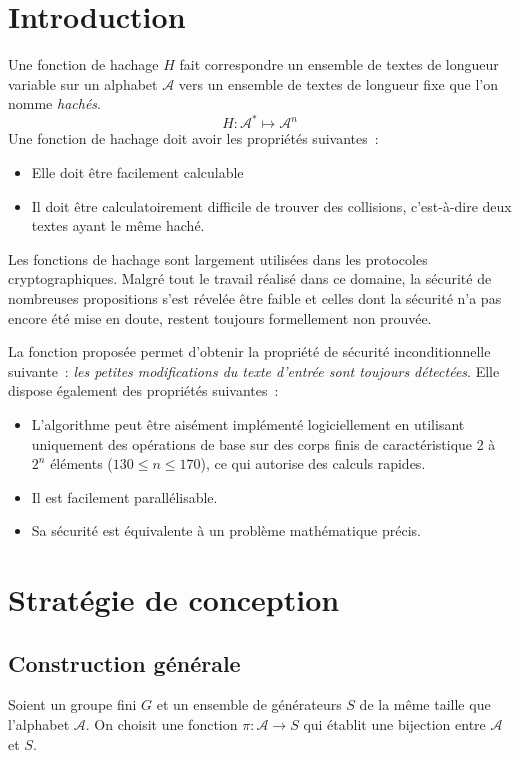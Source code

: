 \documentclass[a4paper,10pt]{article}
\theoremstyle{break}
\newcommand{\A}{\mathcal{A}}
\begin{document}
\begin{multicols}{2}
\section{Introduction}
Une fonction de hachage $H$ fait correspondre un ensemble de textes de longueur variable sur un alphabet $\A$ vers un 
ensemble de textes de longueur fixe que l'on nomme \textit{hachés}.
$$ H:\A^* \longmapsto \A^n $$ 
Une fonction de hachage doit avoir les propriétés suivantes~:
\begin{itemize}
 \item Elle doit être facilement calculable
 \item Il doit être calculatoirement difficile de trouver des collisions, c'est-à-dire deux textes ayant le même haché.
\end{itemize}

Les fonctions de hachage sont largement utilisées dans les protocoles cryptographiques. Malgré tout le travail réalisé 
dans ce domaine, la sécurité de nombreuses propositions s'est révelée être faible et celles dont la sécurité n'a pas encore
été mise en doute, restent toujours formellement non prouvée.

La fonction proposée permet d'obtenir la propriété de sécurité inconditionnelle suivante~: \textit{les petites modifications
du texte d'entrée sont toujours détectées}. Elle dispose également des propriétés suivantes~:
\begin{itemize}
 \item L'algorithme peut être aisément implémenté logiciellement en utilisant uniquement des opérations de base sur des corps
  finis de caractéristique 2 à $2^n$ éléments ($130 \le n \le 170$), ce qui autorise des calculs rapides.
 \item Il est facilement parallélisable.
 \item Sa sécurité est équivalente à un problème mathématique précis.
\end{itemize}

\section{Stratégie de conception}
\subsection{Construction générale}
Soient un groupe fini $G$ et un ensemble de générateurs $S$ de la même taille que l'alphabet $\A$.
On choisit une fonction $\pi: \A \longrightarrow S$ qui établit une bijection entre $\A$ et $S$.


\end{multicols}
\end{document}
